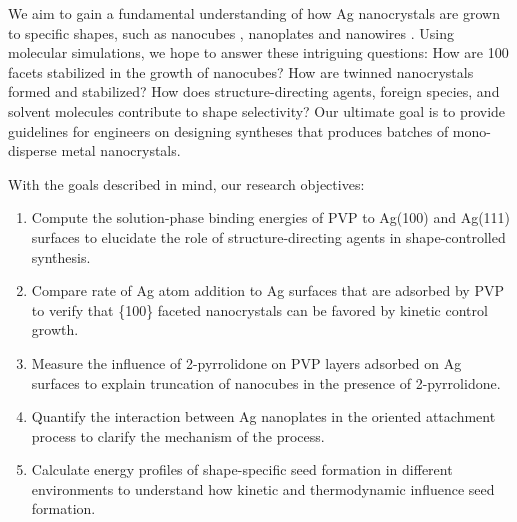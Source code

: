 We aim to gain a fundamental understanding of how Ag nanocrystals are grown to specific shapes, such as nanocubes \cite{Im_2005}, nanoplates \cite{Lofton_2005} and nanowires \cite{Tsuji_2008}.
Using molecular simulations, we hope to answer these intriguing questions:
How are {100} facets stabilized in the growth of nanocubes?
How are twinned nanocrystals formed and stabilized?
How does structure-directing agents, foreign species, and solvent molecules contribute to shape selectivity?
Our ultimate goal is to provide guidelines for engineers on designing syntheses that produces batches of mono-disperse metal nanocrystals.

With the goals described in mind, our research objectives:
\begin{enumerate}
\item Compute the solution-phase binding energies of PVP to Ag(100) and Ag(111) surfaces to elucidate the role of structure-directing agents in shape-controlled synthesis.
\item Compare rate of Ag atom addition to Ag surfaces that are adsorbed by PVP to verify that \{100\} faceted nanocrystals can be favored by kinetic control growth.
\item Measure the influence of 2-pyrrolidone on PVP layers adsorbed on Ag surfaces to explain truncation of nanocubes in the presence of 2-pyrrolidone.
\item Quantify the interaction between Ag nanoplates in the oriented attachment process to clarify the mechanism of the process.
\item Calculate energy profiles of shape-specific seed formation in different environments to understand how kinetic and thermodynamic influence seed formation.
\end{enumerate}
    
    
    
    